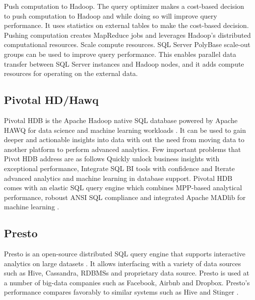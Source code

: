      Push computation to Hadoop. The query optimizer makes a cost-based 
     decision to push computation to Hadoop and while doing so will 
     improve query performance. It uses statistics on external tables 
     to make the cost-based decision. Pushing computation creates 
     MapReduce jobs and leverages Hadoop's distributed computational 
     resources. Scale compute resources. SQL Server PolyBase scale-out 
     groups can be used to improve query performance. This enables parallel 
     data transfer between SQL Server instances and Hadoop nodes, 
     and it adds compute resources for operating on the external data.

     \pv


\subsection{Pivotal HD/Hawq}

     Pivotal HDB is the Apache Hadoop native SQL database powered by
     Apache HAWQ for data science and machine
     learning workloads \cite{www-apache-hqwq}. It can be used
     to gain deeper and actionable
     insights into data with out the need from moving data to another
     platform to perform advanced analytics. Few important problems
     that Pivot HDB address are as follows Quickly unlock business
     insights with exceptional performance, Integrate SQL BI tools
     with confidence and Iterate advanced analytics and machine
     learning in database support. Pivotal HDB comes with an elastic
     SQL query engine which combines MPP-based analytical performance,
     roboust ANSI SQL compliance and integrated Apache MADlib for
     machine learning \cite{www-pivotalhdb}.

     \pv
     
\subsection{Presto}

     Presto is an open-source distributed SQL query
     engine that supports interactive analytics
     on large datasets \cite{www-presto}. It
     allows interfacing with a variety of data sources such as Hive,
     Cassandra, RDBMSs and proprietary data source. Presto is used at a
     number of big-data companies such as Facebook, Airbnb and
     Dropbox. Presto's performance compares favorably to similar systems
     such as Hive and Stinger \cite{presto-paper-2014}.

     \pv

